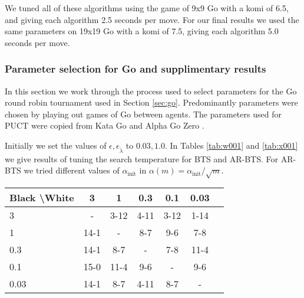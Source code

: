 \documentclass{article}
\theoremstyle{plain}
\begin{document}
\begin{appendices}
    		We tuned all of these algorithms using the game of 9x9 Go with a komi of 6.5, and giving each algorithm 2.5 seconds per move. For our final results we used the same parameters on 19x19 Go with a komi of 7.5, giving each algorithm 5.0 seconds per move.

        




        \subsubsection{Parameter selection for Go and supplimentary results} \label{app:go_hps}

            In this section we work through the process used to select parameters for the Go round robin tournament used in Section \ref{sec:go}. Predominantly parameters were chosen by playing out games of Go between agents. The parameters used for PUCT were copied from Kata Go and Alpha Go Zero . 
            
            Initially we set the values of $\epsilon,\epsilon_{\tilde{\lambda}}$ to $0.03,1.0$. In Tables \ref{tab:w001} and \ref{tab:x001} we give results of tuning the search temperature for BTS and AR-BTS. For AR-BTS we tried different values of $\alpha_{\text{init}}$ in $\alpha(m)=\alpha_{\text{init}}/\sqrt{m}$.
            
            \begin{table*}[]
            \centering
                \begin{tabular}{l|cccccc}
                    \textbf{Black \textbackslash White}     & 3  & 1   & 0.3   & 0.1    & 0.03    \\ 
                    \hline
                                            3            & -     & 3-12  & 4-11  & 3-12  & 1-14  \\
                                            1             & 14-1  & -     & 8-7  & 9-6  & 7-8  \\
                                            0.3             & 14-1   & 8-7   &   -   & 7-8  & 11-4  \\
                                            0.1              & 15-0  & 11-4  & 9-6  & -     & 9-6  \\
                                            0.03              & 14-1  & 8-7  & 4-11  & 8-7  &   -   \\    
                \end{tabular}
                \caption{Results for round robin to select the temperature parameter $\alpha$ for BTS. The value of 0.1 won all four of its matches so was selected. \label{tab:w001}}
            \end{table*}
            

\end{appendices}
\end{document}

